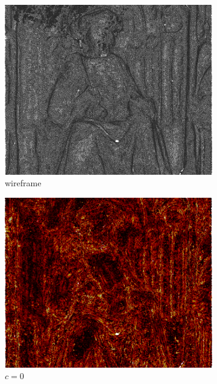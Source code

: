 \begin{figure}[ht]
	\begin{subfigure}[b]{0.32\linewidth}
		\includegraphics[width=\linewidth]
		{data/acquired_meshes/unisiegel_wireframe.png}
		\caption{wireframe}\label{fig:bun.a}
	\end{subfigure}
	\begin{subfigure}[b]{0.32\linewidth}
		\includegraphics[width=\linewidth]
		{data/acquired_meshes/unisiegel_0iter.png}
		\caption{$c=0$}\label{fig:bun.b}
	\end{subfigure}
	\begin{subfigure}[b]{0.32\linewidth}

\end{subfigure}
\end{figure}
